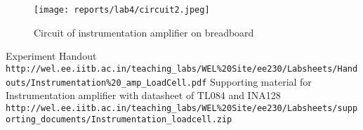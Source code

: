 \documentclass[12pt]{article}
\begin{document}
    \begin{figure}[H]
      \centering
      \texttt{[image: reports/lab4/circuit2.jpeg]}
      \caption{Circuit of instrumentation amplifier on breadboard}
      \label{fig:instru}
    \end{figure}
      
\vspace{4cm}

    \begin{thebibliography}{9}

        Experiment Handout 
        \\\texttt{http://wel.ee.iitb.ac.in/teaching\_labs/WEL\%20Site/ee230/Labsheets/Handouts/Instrumentation\%20\_amp\_LoadCell.pdf}
        Supporting material for Instrumentation amplifier with datasheet of TL084 and INA128
        \\\texttt{http://wel.ee.iitb.ac.in/teaching\_labs/WEL\%20Site/ee230/Labsheets/supporting\_documents/Instrumentation\_loadcell.zip}
        
    \end{thebibliography}
\end{document}
